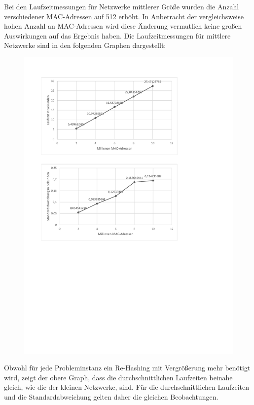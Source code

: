 Bei den Laufzeitmessungen für Netzwerke mittlerer Größe wurden die Anzahl verschiedener MAC-Adressen auf 512 erhöht. In Anbetracht der vergleichsweise hohen Anzahl an MAC-Adressen wird diese Änderung vermutlich keine großen Auswirkungen auf das Ergebnis haben. Die Laufzeitmessungen für mittlere Netzwerke sind in den folgenden Graphen dargestellt:
\begin{figure}[H]
	\hspace*{-1.7cm}\includegraphics[width=1.5\linewidth]{Bilder/benchmark_network_medium.pdf}
\end{figure}
\newpage
Obwohl für jede Probleminstanz ein Re-Hashing mit Vergrößerung mehr benötigt wird, zeigt der obere Graph, dass die durchschnittlichen Laufzeiten beinahe gleich, wie die der kleinen Netzwerke, sind. Für die durchschnittlichen Laufzeiten und die Standardabweichung gelten daher die gleichen Beobachtungen. 

